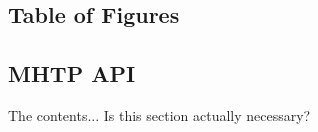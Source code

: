 \documentclass[11pt]{report}
\begin{document}

\newpage

\newpage

\newpage

\newpage

\tableofcontents
\newpage

\section{Table of Figures}
\newpage


\newpage

\newpage

\newpage

\newpage

\newpage

\newpage

\newpage

\newpage


\newpage



\newpage
\begin{appendices}
\chapter{MHTP API}
The contents...
Is this section actually necessary?
\end{appendices}
\end{document}
